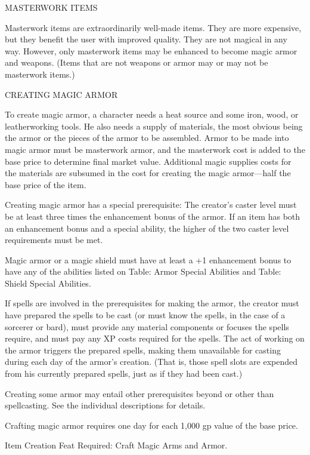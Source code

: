 \vspace{12pt}
{\large MASTERWORK ITEMS}

Masterwork items are extraordinarily well-made items. They are more expensive, 
but they benefit the user with improved quality. They are not magical in any way. 
However, only masterwork items may be enhanced to become magic armor and weapons. 
(Items that are not weapons or armor may or may not be masterwork items.)

\vspace{12pt}
{\large CREATING MAGIC ARMOR}

To create magic armor, a character needs a heat source and some iron, wood, or 
leatherworking tools. He also needs a supply of materials, the most obvious being 
the armor or the pieces of the armor to be assembled. Armor to be made into magic 
armor must be masterwork armor, and the masterwork cost is added to the base price 
to determine final market value. Additional magic supplies costs for the materials 
are subsumed in the cost for creating the magic armor---half the base price of 
the item.

Creating magic armor has a special prerequisite: The creator's caster level must 
be at least three times the enhancement bonus of the armor. If an item has both 
an enhancement bonus and a special ability, the higher of the two caster level 
requirements must be met.

Magic armor or a magic shield must have at least a +1 enhancement bonus to have 
any of the abilities listed on Table: Armor Special Abilities and Table: Shield 
Special Abilities.

If spells are involved in the prerequisites for making the armor, the creator must 
have prepared the spells to be cast (or must know the spells, in the case of a 
sorcerer or bard), must provide any material components or focuses the spells require, 
and must pay any XP costs required for the spells. The act of working on the armor 
triggers the prepared spells, making them unavailable for casting during each day 
of the armor's creation. (That is, those spell slots are expended from his currently 
prepared spells, just as if they had been cast.)

Creating some armor may entail other prerequisites beyond or other than spellcasting. 
See the individual descriptions for details.

Crafting magic armor requires one day for each 1,000 gp value of the base price.

Item Creation Feat Required: Craft Magic Arms and Armor.

